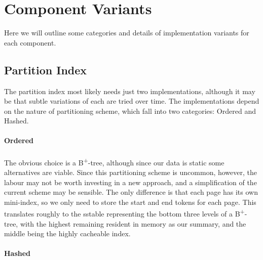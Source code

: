 \documentclass[fleqn]{article}
\begin{document}
\clearpage
\section{Component Variants}
Here we will outline some categories and details of implementation variants for each component.

\subsection{Partition Index}
The partition index most likely needs just two implementations, although it may be that subtle variations
of each are tried over time. The implementations depend on the nature of partitioning scheme, which
fall into two categories: Ordered and Hashed.
\paragraph{Ordered}
\paragraph{}
    The obvious choice is a B\textsuperscript{+}-tree, although since our data is static some alternatives are viable.
    Since this partitioning scheme is uncommon, however, the labour may not be worth investing in a new approach,
    and a simplification of the current scheme may be sensible. The only difference is that each page has its own
    mini-index, so we only need to store the start and end tokens for each page. This translates roughly to 
    the sstable representing the bottom three levels of a B\textsuperscript{+}-tree, with the highest 
    remaining resident in memory as our summary, and the middle being the highly cacheable index.
\paragraph{Hashed}
\end{document}
